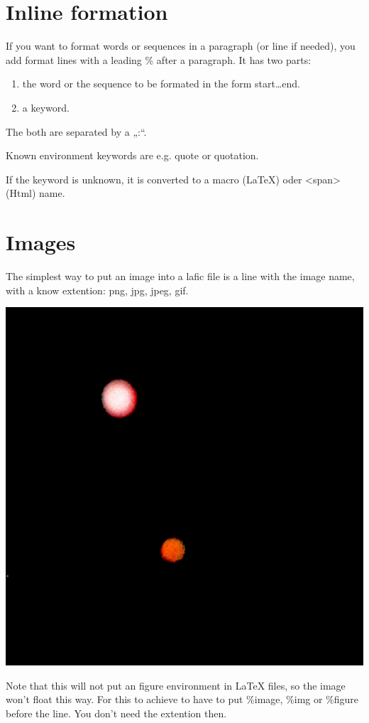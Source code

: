 \documentclass{scrartcl}
\begin{document}
\section{Inline formation}

If you want to format words or sequences in a paragraph (or
line if needed), you add format lines with a leading \% after
a paragraph. It has two parts:

\begin{enumerate}
\item the word or the sequence to be formated in the form
start…end. 
\item a keyword.

\end{enumerate}

The both are separated by a „:“.

Known environment keywords are e.g. quote or quotation.

If the keyword is unknown, it is converted to a macro
(LaTeX) oder <span> (Html) name.

\section{Images}

The simplest way to put an image into a lafic file is a
line with the image name, with a know extention: png, jpg,
jpeg, gif.

\includegraphics[width=.50\linewidth]{Image.png}

Note that this will not put an figure environment in \LaTeX
files, so the image won't float this way. For this to
achieve to have to put \%image, \%img or \%figure before the
line. You don't need the extention then.
\end{document}
